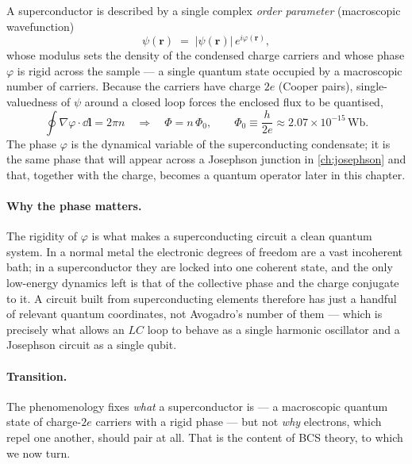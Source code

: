\begin{statement}
\label{stmt:flux-quantisation}
A superconductor is described by a single complex \emph{order
parameter} (macroscopic wavefunction)
\begin{equation}
\label{eq:order-parameter}
\psi(\mathbf r) \;=\; |\psi(\mathbf r)|\,e^{i\varphi(\mathbf r)},
\end{equation}
whose modulus sets the density of the condensed charge carriers and
whose phase $\varphi$ is rigid across the sample --- a single quantum
state occupied by a macroscopic number of carriers. Because the
carriers have charge $2e$ (Cooper pairs), single-valuedness of
$\psi$ around a closed loop forces the enclosed flux to be quantised,
\begin{equation}
\label{eq:flux-quantum}
\oint \nabla\varphi\cdot\dd\mathbf l = 2\pi n
\quad\Longrightarrow\quad
\Phi = n\,\Phi_0,
\qquad
\Phi_0 \equiv \frac{h}{2e}\approx 2.07\times10^{-15}\,\text{Wb}.
\end{equation}
The phase $\varphi$ is the dynamical variable of the superconducting
condensate; it is the same phase that will appear across a Josephson
junction in \cref{ch:josephson} and that, together with the charge,
becomes a quantum operator later in this chapter.
\end{statement}

\paragraph{Why the phase matters.}
The rigidity of $\varphi$ is what makes a superconducting circuit a
clean quantum system. In a normal metal the electronic degrees of
freedom are a vast incoherent bath; in a superconductor they are
locked into one coherent state, and the only low-energy dynamics left
is that of the collective phase and the charge conjugate to it. A
circuit built from superconducting elements therefore has just a
handful of relevant quantum coordinates, not Avogadro's number of
them --- which is precisely what allows an $LC$ loop to behave as a
single harmonic oscillator and a Josephson circuit as a single qubit.

\paragraph{Transition.}
The phenomenology fixes \emph{what} a superconductor is --- a
macroscopic quantum state of charge-$2e$ carriers with a rigid phase
--- but not \emph{why} electrons, which repel one another, should
pair at all. That is the content of BCS theory, to which we now turn.


